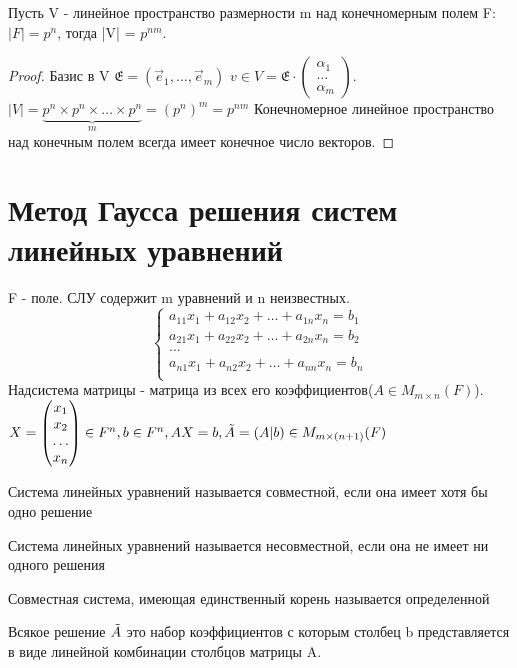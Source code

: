 \begin{note}
	Пусть V - линейное пространство размерности m над конечномерным полем F: \(|F| = p^n\), тогда |V| = \(p^{nm}\).
\end{note}
\begin{proof}
	Базис в V \(\mathfrak{E} = (\vec e_1, \ldots, \vec e_m)\)
	\(v\in V = \mathfrak{E}\cdot\begin{pmatrix}
		\alpha_1 \\ \ldots \\ \alpha_m
	\end{pmatrix}\).
	 \(|V| = \underbrace{p^n\times p^n\times\ldots\times p^n}_m = (p^n)^m=p^{nm}\)
	Конечномерное линейное пространство над конечным полем всегда имеет конечное число векторов.
\end{proof}

\section{Метод Гаусса решения систем линейных уравнений}
F - поле.
СЛУ содержит m уравнений и n неизвестных.
\[\left\{\begin{gathered}
	a_{11}x_1+a_{12}x_2+\ldots+a_{1n}x_n = b_1 \\
	a_{21}x_1+a_{22}x_2+\ldots+a_{2n}x_n = b_2 \\
	\ldots \\
	a_{n1}x_1+a_{n2}x_2+\ldots+a_{nn}x_n = b_n \\
\end{gathered}\right.\]
Надсистема матрицы - матрица из всех его коэффициентов(\(A\in M_{m\times n}(F)\)).
\(X = \begin{pmatrix}
	x_1 \\ x_2 \\ \ldots \\ x_n
\end{pmatrix}\in F^n, b \in F^n, AX = b, \Tilde{A} = (A|b)\in M_{m\times(n+1)}(F)\)
\begin{definition}
	Система линейных уравнений называется совместной, если она имеет хотя бы одно решение
\end{definition}
\begin{definition}
	Система линейных уравнений называется несовместной, если она не имеет ни одного решения
\end{definition}
\begin{definition}
	Совместная система, имеющая единственный корень называется определенной
\end{definition}
\begin{proposition}
	Всякое решение \(\Tilde{A}\) это набор коэффициентов с которым столбец b представляется в виде линейной комбинации столбцов матрицы A.
\end{proposition}
